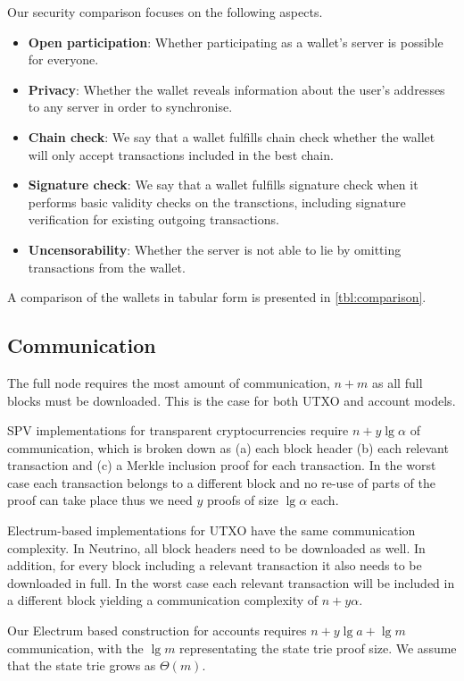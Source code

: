 Our security comparison focuses on the following aspects.
\begin{itemize}
    \item \textbf{Open participation}: Whether participating as a wallet's server is possible for everyone.
    \item \textbf{Privacy}: Whether the wallet reveals information about the user's addresses to any server in order to synchronise.
    \item \textbf{Chain check}: We say that a wallet fulfills chain check whether the wallet will only accept transactions included in the best chain.
    \item \textbf{Signature check}: We say that a wallet fulfills signature check when it performs basic validity checks on the transctions, including signature verification for existing outgoing transactions.
    \item \textbf{Uncensorability}: Whether the server is not able to lie by omitting transactions from the wallet.
\end{itemize}

A comparison of the wallets in tabular form is presented in \cref{tbl:comparison}.

\subsection{Communication}
The full node requires the most amount of communication, $n+m$ as all full blocks must be downloaded. This is the case for both UTXO and account models.

SPV implementations for transparent cryptocurrencies require $n+y\lg{\alpha}$ of communication, which is broken down as (a) each block header (b) each relevant transaction and (c) a Merkle inclusion proof for each transaction. In the worst case each transaction belongs to a different block and no re-use of parts of the proof can take place thus we need $y$ proofs of size $\lg{\alpha}$ each.

Electrum-based implementations for UTXO have the same communication complexity. In Neutrino, all block headers need to be downloaded as well. In addition, for every block including a relevant transaction it also needs to be downloaded in full. In the worst case each relevant transaction will be included in a different block yielding a communication complexity of $n+y\alpha$.

Our Electrum based construction for accounts requires $n+y\lg{a}+\lg{m}$ communication, with the $\lg{m}$ representating the state trie proof size. We assume that the state trie grows as $\Theta(m)$.

